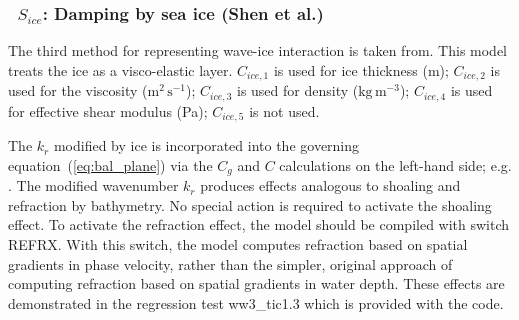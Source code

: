 \vsssub
\subsubsection{~$S_{ice}$: Damping by sea ice (Shen et al.)} \label{sec:ICE3}
\vsssub


\noindent
The third method for representing wave-ice interaction is taken
from\linebreak \cite{art:WS10}. This model treats the ice as a visco-elastic
layer. ${C_{ice,1}}$ is used for ice thickness (m);  ${C_{ice,2}}$
is used for the viscosity ($\mathrm{m^2\,s^{-1}}$); ${C_{ice,3}}$ is
used for density ($\mathrm{kg\,m^{-3}}$); ${C_{ice,4}}$ is used for
effective shear modulus (Pa); ${C_{ice,5}}$ is not used.

\vspace{\baselineskip} \noindent
The ${k_r}$ modified by ice is incorporated into the governing
equation~(\ref{eq:bal_plane}) via the $C_g$ and $C$ calculations on the
left-hand side; e.g. \citet[][and subsequent unpublished work]{art:RogHol09}.
The modified wavenumber ${k_r}$ produces effects analogous to shoaling
and refraction by bathymetry. No special action is required to activate
the shoaling effect. To activate the refraction effect, the model should
be compiled with switch {\code REFRX}. With this switch, the model
computes refraction based on spatial gradients in phase velocity,
rather than the simpler, original approach of computing refraction
based on spatial gradients in water depth. These effects are demonstrated
in the regression test {\file ww3\_tic1.3} which is provided with
the code.


\vspace{\baselineskip} \noindent
